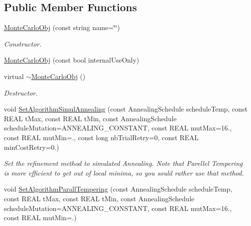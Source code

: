 \subsection*{Public Member Functions}
\begin{DoxyCompactItemize}
\item 
\mbox{\label{class_obj_cryst_1_1_monte_carlo_obj_a6ef446b8361a8c53d016f213f0d1e17f}} 
\mbox{\hyperlink{class_obj_cryst_1_1_monte_carlo_obj_a6ef446b8361a8c53d016f213f0d1e17f}{Monte\+Carlo\+Obj}} (const string name=\char`\"{}\char`\"{})
\begin{DoxyCompactList}\small\item\em Constructor. \end{DoxyCompactList}\item 
\mbox{\hyperlink{class_obj_cryst_1_1_monte_carlo_obj_a503419b4b79fdb5ae41928656a888ec8}{Monte\+Carlo\+Obj}} (const bool internal\+Use\+Only)
\item 
\mbox{\label{class_obj_cryst_1_1_monte_carlo_obj_a41bb7821705ad4f96318f6af75f7c067}} 
virtual \mbox{\hyperlink{class_obj_cryst_1_1_monte_carlo_obj_a41bb7821705ad4f96318f6af75f7c067}{$\sim$\+Monte\+Carlo\+Obj}} ()
\begin{DoxyCompactList}\small\item\em Destructor. \end{DoxyCompactList}\item 
void \mbox{\hyperlink{class_obj_cryst_1_1_monte_carlo_obj_ac094251dbd02a4709dd4afb29d8454e5}{Set\+Algorithm\+Simul\+Annealing}} (const Annealing\+Schedule schedule\+Temp, const R\+E\+AL t\+Max, const R\+E\+AL t\+Min, const Annealing\+Schedule schedule\+Mutation=A\+N\+N\+E\+A\+L\+I\+N\+G\+\_\+\+C\+O\+N\+S\+T\+A\+NT, const R\+E\+AL mut\+Max=16., const R\+E\+AL mut\+Min=., const long nb\+Trial\+Retry=0, const R\+E\+AL min\+Cost\+Retry=0.)
\begin{DoxyCompactList}\small\item\em Set the refinement method to simulated Annealing. Note that Parellel Tempering is more efficient to get out of local minima, so you sould rather use that method. \end{DoxyCompactList}\item 
void \mbox{\hyperlink{class_obj_cryst_1_1_monte_carlo_obj_a54c7ad3cb78846c82c65d6a6db27801a}{Set\+Algorithm\+Parall\+Tempering}} (const Annealing\+Schedule schedule\+Temp, const R\+E\+AL t\+Max, const R\+E\+AL t\+Min, const Annealing\+Schedule schedule\+Mutation=A\+N\+N\+E\+A\+L\+I\+N\+G\+\_\+\+C\+O\+N\+S\+T\+A\+NT, const R\+E\+AL mut\+Max=16., const R\+E\+AL mut\+Min=.)

\end{DoxyCompactItemize}
